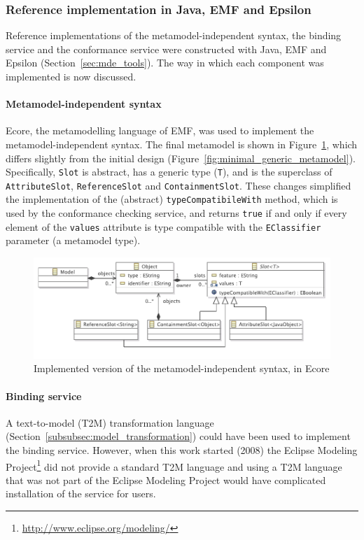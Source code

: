 \subsubsection{Reference implementation in Java, EMF and Epsilon}
\label{subsubsec:mmi_impl}
Reference implementations of the metamodel-independent syntax, the binding service and the conformance service were constructed with Java, EMF and Epsilon (Section~\ref{sec:mde_tools}). The way in which each component was implemented is now discussed.

\paragraph{Metamodel-independent syntax} Ecore, the metamodelling language of EMF, was used to implement the metamodel-independent syntax. The final metamodel is shown in Figure~\ref{fig:mmi_syntax_impl}, which differs slightly from the initial design (Figure~\ref{fig:minimal_generic_metamodel}). Specifically, \texttt{Sl\-ot} is abstract, has a generic type (\texttt{T}), and is the superclass of \texttt{Att\-ri\-bu\-teSl\-ot}, \texttt{Re\-fe\-re\-n\-ceSl\-ot} and \texttt{Co\-nt\-ai\-nm\-entSl\-ot}. These changes simplified the implementation of the (abstract) \texttt{ty\-peCo\-mp\-at\-ib\-i\-leWi\-th} method, which is used by the conformance checking service, and returns \texttt{true} if and only if every element of the \texttt{va\-lu\-es} attribute is type compatible with the \texttt{EC\-la\-ss\-if\-ier} parameter (a metamodel type).  

\begin{figure}[htbp]
  \centering
  \includegraphics[width=12cm]{5.Implementation/images/slot_model_complete.pdf}
  \caption[Implemented version of the metamodel-independent syntax]{Implemented version of the metamodel-independent syntax, in Ecore}
  \label{fig:mmi_syntax_impl}
\end{figure}

\paragraph{Binding service} A text-to-model (T2M) transformation language (Section~\ref{subsubsec:model_transformation}) could have been used to implement the binding service. However, when this work started (2008) the Eclipse Modeling Project\footnote{\url{http://www.eclipse.org/modeling/}} did not provide a standard T2M language and using a T2M language that was not part of the Eclipse Modeling Project would have complicated installation of the service for users.

